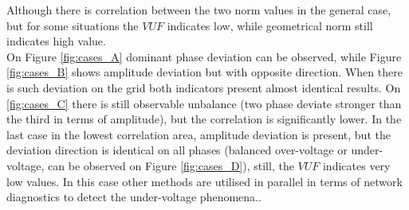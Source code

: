             Although there is correlation between the two norm values in the general case, but for some situations the $VUF$ indicates low, while geometrical norm still indicates high value.\\
            On Figure \ref{fig:cases_A} dominant phase deviation can be observed, while Figure \ref{fig:cases_B} shows amplitude deviation but with opposite direction. When there is such deviation on the grid both indicators present almost identical results. On \ref{fig:cases_C} there is still observable unbalance (two phase deviate stronger than the third in terms of amplitude), but the correlation is significantly lower. In the last case in the lowest correlation area, amplitude deviation is present, but the deviation direction is identical on all phases (balanced over-voltage or under-voltage, can be observed on Figure \ref{fig:cases_D}), still, the $VUF$ indicates very low values. In this case other methods are utilised in parallel in terms of network diagnostics to detect the under-voltage phenomena.\cite{arn1997under-voltage}.



